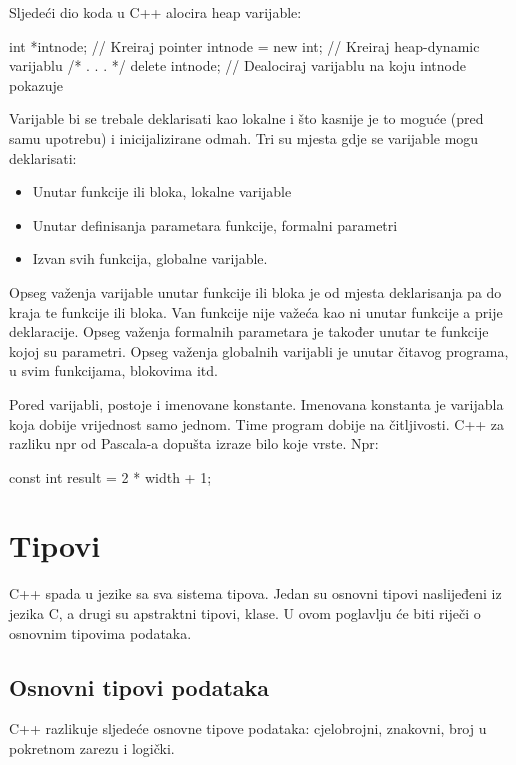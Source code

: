 \documentclass[11pt]{book}
\begin{document}
Sljedeći dio koda u C++ alocira heap varijable:

\begin{shortlisting}
  int *intnode; // Kreiraj pointer
  intnode = new int; // Kreiraj heap-dynamic varijablu
  /* . . .  */
  delete intnode; // Dealociraj varijablu na koju intnode pokazuje
\end{shortlisting}

Varijable bi se trebale deklarisati kao lokalne i što kasnije je to moguće (pred samu upotrebu) i inicijalizirane odmah. Tri su mjesta gdje se varijable mogu deklarisati:

\begin{itemize}
  \item Unutar funkcije ili bloka, lokalne varijable
  \item Unutar definisanja parametara funkcije, formalni parametri
  \item Izvan svih funkcija, globalne varijable.
\end{itemize}
Opseg  važenja  varijable  unutar  funkcije  ili  bloka  je  od  mjesta  deklarisanja  pa  do  kraja  te funkcije ili bloka. Van funkcije nije važeća kao ni unutar funkcije a prije deklaracije.  Opseg važenja formalnih parametara je također unutar te funkcije kojoj su parametri.  Opseg važenja globalnih varijabli je unutar čitavog programa, u svim funkcijama, blokovima
itd.

Pored varijabli, postoje i imenovane konstante. Imenovana konstanta je varijabla koja dobije vrijednost samo jednom. Time program dobije na čitljivosti. C++ za razliku npr od Pascala-a dopušta izraze bilo koje vrste.  Npr:

\begin{shortlisting}
  const int result = 2 * width + 1;
\end{shortlisting}

\section{Tipovi}

C++ spada u jezike sa sva sistema tipova. Jedan su osnovni tipovi naslijeđeni iz jezika C, a drugi su apstraktni tipovi, klase. U ovom poglavlju će biti riječi o osnovnim tipovima podataka.

\subsection{Osnovni tipovi podataka}

C++ razlikuje sljedeće osnovne tipove podataka: cjelobrojni, znakovni, broj u pokretnom zarezu i logički.
\end{document}
